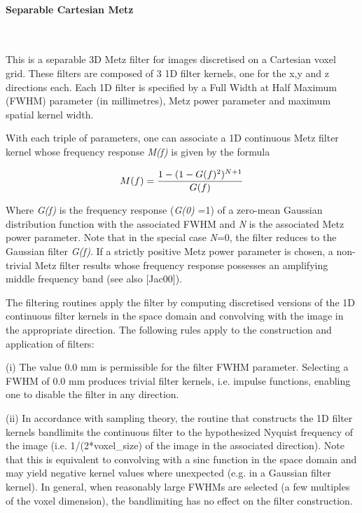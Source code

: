 \documentclass{article}
\newcommand{\subsubsubsection}[1]{\paragraph{#1}\mbox{} \\}
\begin{document}
{{ \subsubsubsection{Separable Cartesian Metz}
}
This is a separable 3D Metz filter for images discretised on 
a Cartesian voxel grid. These filters are composed of 3 1D filter 
kernels, one for the x,y and z directions each. Each 1D filter 
is specified by a Full Width at Half Maximum (FWHM) parameter 
(in millimetres), Metz power parameter and maximum spatial kernel 
width. 



With each triple of parameters, one can associate a 1D continuous 
Metz filter kernel whose frequency response \textit{M(f)} is given 
by the formula

\[
M(f)=
{1-(1-G(f)^2)^{N+1}
\over
G(f)
}
\]

Where \textit{G(f)} is the frequency response (\textit{G(0)} =1) of a zero-mean 
Gaussian distribution function with the associated FWHM and \textit{N} 
is the associated Metz power parameter. Note that in the special 
case \textit{N}=0, the filter reduces to the Gaussian filter \textit{G(f)}. 
If a strictly positive Metz power parameter is chosen, a non-trivial 
Metz filter results whose frequency response possesses an amplifying 
middle frequency band (see also [Jac00]).



The filtering routines apply the filter by computing discretised 
versions of the 1D continuous filter kernels in the space domain 
and convolving with the image in the appropriate direction. The 
following rules apply to the construction and application of 
filters:



(i) The value 0.0 mm is permissible for the filter FWHM parameter. 
Selecting a FWHM of 0.0 mm produces trivial filter kernels, i.e. 
impulse functions, enabling one to disable the filter in any 
direction. 



(ii) In accordance with sampling theory, the routine that constructs 
the 1D filter kernels bandlimits the continuous filter to the 
hypothesized Nyquist frequency of the image (i.e. 1/(2*voxel\_size) 
of the image in the associated direction). Note that this is 
equivalent to convolving with a sinc function in the space domain 
and may yield negative kernel values where unexpected (e.g. in 
a Gaussian filter kernel). In general, when reasonably large 
FWHMs are selected (a few multiples of the voxel dimension), 
the bandlimiting has no effect on the filter construction.



}
\end{document}
